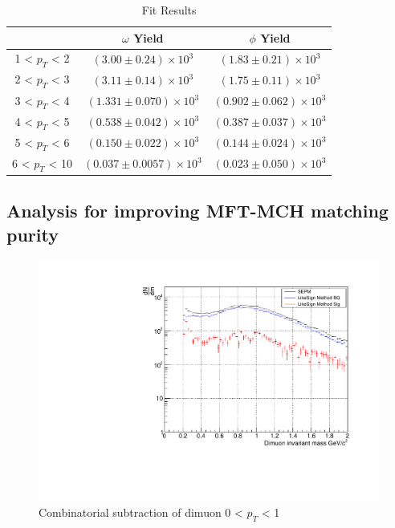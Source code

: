             \begin{table}[htbp]
                \centering
                \caption{Fit Results}
                \begin{tabular}{|c||c|c|}
                    \hline
                    & $\omega$ Yield & $\phi$ Yield \\ \hline \hline
                    1 < $p_{T}$ < 2 &$(3.00\pm0.24)\times10^3$& $(1.83\pm0.21)\times10^3$\\ \hline
                    2 < $p_{T}$ < 3 &$(3.11\pm0.14)\times10^3$& $(1.75\pm0.11)\times10^3$\\ \hline
                    3 < $p_{T}$ < 4 &$(1.331\pm0.070)\times10^3$& $(0.902\pm0.062)\times10^3$\\ \hline
                    4 < $p_{T}$ < 5 &$(0.538\pm0.042)\times10^3$& $(0.387\pm0.037)\times10^3$\\ \hline
                    5 < $p_{T}$ < 6 &$(0.150\pm0.022)\times10^3$& $(0.144\pm0.024)\times10^3$\\ \hline
                    6 < $p_{T}$ < 10 &$(0.037\pm0.0057)\times10^3$& $(0.023\pm0.050)\times10^3$\\ \hline     
                \end{tabular}
                \label{Analysis:Dimuon:Yield:Results}
            \end{table}


    \subsection{Analysis for improving MFT-MCH matching purity}

    \begin{figure}
        \centering
        \includegraphics[keepaspectratio, scale=0.4]{fig/3_6_CB_pt0to1.pdf}
        \caption{Combinatorial subtraction of dimuon 0 < $p_T$ < 1}
        \label{Analysis:Dimuon:pt0to1}
    \end{figure}

